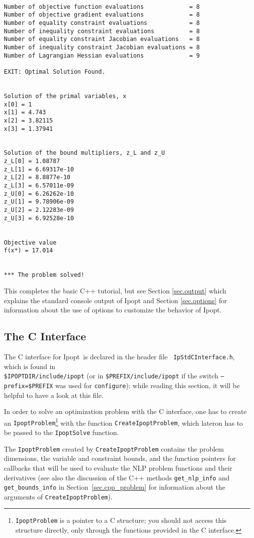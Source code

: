 \documentclass[letter,10pt]{article}
\newcommand{\Ipopt}{{\sc Ipopt}}
\begin{document}
\begin{footnotesize}
\begin{verbatim}
 
Number of objective function evaluations             = 8
Number of objective gradient evaluations             = 8
Number of equality constraint evaluations            = 8
Number of inequality constraint evaluations          = 8
Number of equality constraint Jacobian evaluations   = 8
Number of inequality constraint Jacobian evaluations = 8
Number of Lagrangian Hessian evaluations             = 9
 
EXIT: Optimal Solution Found.
 
 
Solution of the primal variables, x
x[0] = 1
x[1] = 4.743
x[2] = 3.82115
x[3] = 1.37941
 
 
Solution of the bound multipliers, z_L and z_U
z_L[0] = 1.08787
z_L[1] = 6.69317e-10
z_L[2] = 8.8877e-10
z_L[3] = 6.57011e-09
z_U[0] = 6.26262e-10
z_U[1] = 9.78906e-09
z_U[2] = 2.12283e-09
z_U[3] = 6.92528e-10
 
 
Objective value
f(x*) = 17.014
 
 
*** The problem solved!
\end{verbatim}
\end{footnotesize}

This completes the basic C++ tutorial, but see Section
\ref{sec.output} which explains the standard console output of \Ipopt
and Section \ref{sec.options} for information about the use of options
to customize the behavior of \Ipopt.

\subsection{The C Interface}\label{sec.cinterface}
The C interface for \Ipopt\ is declared in the header file {\tt
  IpStdCInterface.h}, which is found in\\
\texttt{\$IPOPTDIR/include/ipopt} (or in
\texttt{\$PREFIX/include/ipopt} if the switch
\texttt{--prefix=\$PREFIX} was used for {\tt configure}); while
reading this section, it will be helpful to have a look at this file.

In order to solve an optimization problem with the C interface, one
has to create an {\tt IpoptProblem}\footnote{{\tt IpoptProblem} is a
  pointer to a C structure; you should not access this structure
  directly, only through the functions provided in the C interface.}
with the function {\tt CreateIpoptProblem}, which lateron has to be
passed to the {\tt IpoptSolve} function.

The {\tt IpoptProblem} created by {\tt CreateIpoptProblem} contains
the problem dimensions, the variable and constraint bounds, and the
function pointers for callbacks that will be used to evaluate the NLP
problem functions and their derivatives (see also the discussion of
the C++ methods {\tt get\_nlp\_info} and {\tt get\_bounds\_info} in
Section~\ref{sec.cpp_problem} for information about the arguments of
{\tt CreateIpoptProblem}).
\end{document}
